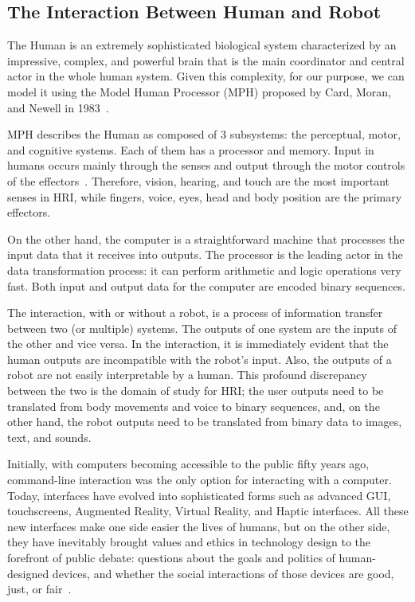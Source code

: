 \subsection{The Interaction Between Human and Robot}\label{subsec:the_interaction}
The Human is an extremely sophisticated biological system characterized by an impressive, complex, and powerful brain that is the main
coordinator and central actor in the whole human system. Given this complexity, for our purpose, we can model it using
the Model Human Processor (MPH) proposed by Card, Moran, and Newell in 1983~\cite{card1986model}. 

MPH describes the Human as composed of 3 subsystems: the perceptual, motor, and cognitive systems. 
Each of them has a processor and memory.
Input in humans occurs mainly through the senses and output through the motor controls of the effectors~\cite{dix2010human}. 
Therefore, vision, hearing, and touch are the most important senses in HRI, while fingers, voice, eyes, 
head and body position are the primary effectors.

On the other hand, the computer is a straightforward machine that processes the input data that it receives into outputs. 
The processor is the leading actor in the data transformation process: it can perform arithmetic and logic operations very fast. 
Both input and output data for the computer are encoded binary sequences.

The interaction, with or without a robot, is a process of information transfer between two (or multiple) systems. 
The outputs of one system are the inputs of the other and vice versa. 
In the interaction, it is immediately evident that the human outputs are incompatible with the robot's input. 
Also, the outputs of a robot are not easily interpretable by a human. 
This profound discrepancy between the two is the domain of study for HRI; the user outputs need to be translated from body movements and voice to binary sequences, and, on the other hand, the robot outputs need to be translated from binary data to images, text, and sounds.

Initially, with computers becoming accessible to the public fifty years ago, command-line interaction was the only option for interacting with a computer. 
Today, interfaces have evolved into sophisticated forms such as advanced GUI, touchscreens, Augmented Reality, Virtual Reality, and Haptic interfaces. 
All these new interfaces make one side easier the lives of humans, but on the other side, they have inevitably brought values 
and ethics in technology design to the forefront of public debate: questions about the goals and politics of human-designed devices, 
and whether the social interactions of those devices are good, just, or fair~\cite{shilton2018hciEthics}. 

